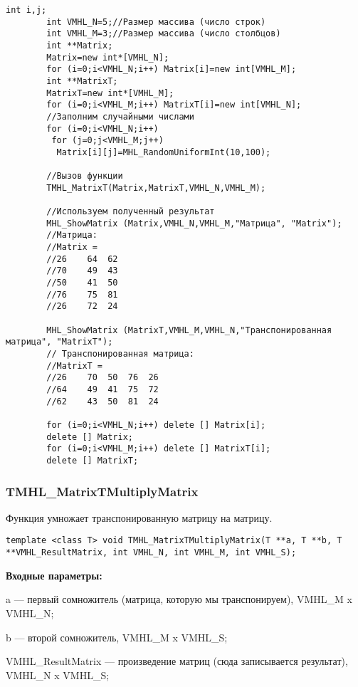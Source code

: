 \documentclass[a4paper,12pt]{article}
\begin{document}
\begin{lstlisting}[label=code_use_TMHL_MatrixT,caption=Пример использования]
        int i,j;
        int VMHL_N=5;//Размер массива (число строк)
        int VMHL_M=3;//Размер массива (число столбцов)
        int **Matrix;
        Matrix=new int*[VMHL_N];
        for (i=0;i<VMHL_N;i++) Matrix[i]=new int[VMHL_M];
        int **MatrixT;
        MatrixT=new int*[VMHL_M];
        for (i=0;i<VMHL_M;i++) MatrixT[i]=new int[VMHL_N];
        //Заполним случайными числами
        for (i=0;i<VMHL_N;i++)
         for (j=0;j<VMHL_M;j++)
          Matrix[i][j]=MHL_RandomUniformInt(10,100);

        //Вызов функции
        TMHL_MatrixT(Matrix,MatrixT,VMHL_N,VMHL_M);

        //Используем полученный результат
        MHL_ShowMatrix (Matrix,VMHL_N,VMHL_M,"Матрица", "Matrix");
        //Матрица:
        //Matrix =
        //26	64	62
        //70	49	43
        //50	41	50
        //76	75	81
        //26	72	24

        MHL_ShowMatrix (MatrixT,VMHL_M,VMHL_N,"Транспонированная матрица", "MatrixT");
        // Транспонированная матрица:
        //MatrixT =
        //26	70	50	76	26
        //64	49	41	75	72
        //62	43	50	81	24

        for (i=0;i<VMHL_N;i++) delete [] Matrix[i];
        delete [] Matrix;
        for (i=0;i<VMHL_M;i++) delete [] MatrixT[i];
        delete [] MatrixT;
\end{lstlisting}

\subsubsection{TMHL\_MatrixTMultiplyMatrix}\label{TMHL_MatrixTMultiplyMatrix}

Функция умножает транспонированную матрицу на матрицу.


\begin{lstlisting}[label=code_syntax_TMHL_MatrixTMultiplyMatrix,caption=Синтаксис]
template <class T> void TMHL_MatrixTMultiplyMatrix(T **a, T **b, T **VMHL_ResultMatrix, int VMHL_N, int VMHL_M, int VMHL_S);
\end{lstlisting}

\textbf{Входные параметры:}
 
a --- первый сомножитель (матрица, которую мы транспонируем), VMHL\_M x VMHL\_N;
 
b --- второй сомножитель, VMHL\_M x VMHL\_S;
 
VMHL\_ResultMatrix --- произведение матриц (сюда записывается результат), VMHL\_N x VMHL\_S;
 
\end{document}
